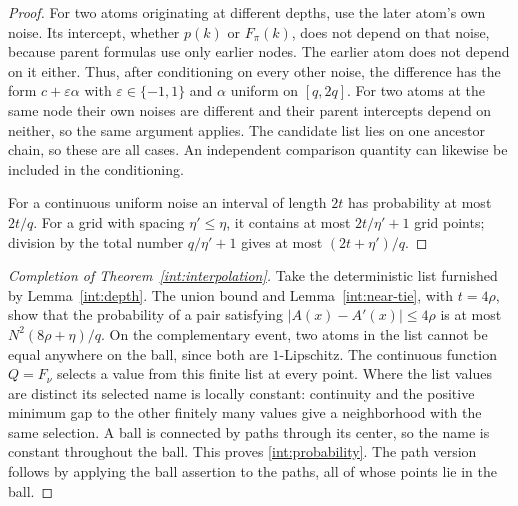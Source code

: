 \begin{proof}
For two atoms originating at different depths, use the later atom's
own noise.  Its intercept, whether $p(k)$ or $F_\pi(k)$, does not
depend on that noise, because parent formulas use only earlier nodes.
The earlier atom does not depend on it either.  Thus, after conditioning
on every other noise, the difference has the form $c+\varepsilon\alpha$
with $\varepsilon\in\{-1,1\}$ and $\alpha$ uniform on $[q,2q]$.
For two atoms at the same node their own noises are different and
their parent intercepts depend on neither, so the same argument
applies.  The candidate list lies on one ancestor chain, so these
are all cases.  An independent comparison quantity can likewise be
included in the conditioning.

For a continuous uniform noise an interval of length $2t$ has
probability at most $2t/q$.  For a grid with spacing $\eta'\le\eta$,
it contains at most $2t/\eta'+1$ grid points; division by the total
number $q/\eta'+1$ gives at most $(2t+\eta')/q$.
\end{proof}

\begin{proof}[Completion of Theorem~\ref{int:interpolation}]
Take the deterministic list furnished by Lemma~\ref{int:depth}.
The union bound and Lemma~\ref{int:near-tie}, with $t=4\rho$, show
that the probability of a pair satisfying
$|A(x)-A'(x)|\le4\rho$ is at most
$N^2(8\rho+\eta)/q$.  On the complementary event, two atoms in the
list cannot be equal anywhere on the ball, since both are
$1$-Lipschitz.  The continuous function $Q=F_\nu$ selects a value
from this finite list at every point.  Where the list values are
distinct its selected name is locally constant: continuity and the
positive minimum gap to the other finitely many values give a
neighborhood with the same selection.  A ball is connected by paths
through its center, so the name is constant throughout the ball.
This proves \eqref{int:probability}.  The path version follows by
applying the ball assertion to the paths, all of whose points lie
in the ball.
\end{proof}

